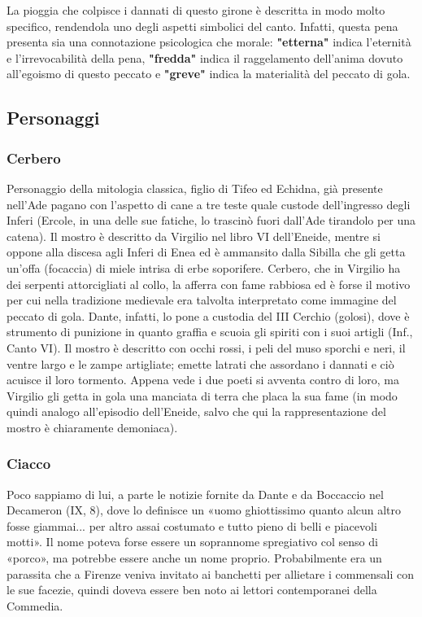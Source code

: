 \documentclass[10pt,a4paper]{article}
\begin{document}
	\label{significati della pioggia}
	La pioggia che colpisce i dannati di questo girone è descritta in modo molto specifico, rendendola uno degli aspetti simbolici del canto. Infatti, questa pena presenta sia una connotazione psicologica che morale: \textbf{"etterna"} indica l'eternità e l'irrevocabilità della pena, \textbf{"fredda"} indica il raggelamento dell'anima dovuto all'egoismo di questo peccato e \textbf{"greve"} indica la materialità del peccato di gola.
	
	\subsection{Personaggi}
	
	\subsubsection{Cerbero}
	
	Personaggio della mitologia classica, figlio di Tifeo ed Echidna, già presente nell'Ade pagano con l'aspetto di cane a tre teste quale custode dell'ingresso degli Inferi (Ercole, in una delle sue fatiche, lo trascinò fuori dall'Ade tirandolo per una catena). Il mostro è descritto da Virgilio nel libro VI dell'Eneide, mentre si oppone alla discesa agli Inferi  di Enea ed è ammansito dalla Sibilla che gli getta un'offa (focaccia) di miele intrisa di erbe soporifere. Cerbero, che in Virgilio ha dei serpenti attorcigliati al collo, la afferra con fame rabbiosa ed è forse il motivo per cui nella tradizione medievale era talvolta interpretato come immagine del peccato di gola.
	Dante, infatti, lo pone a custodia del III Cerchio (golosi), dove è strumento di punizione in quanto graffia e scuoia gli spiriti con i suoi artigli (Inf., Canto VI). Il mostro è descritto con occhi rossi, i peli del muso sporchi e neri, il ventre largo e le zampe artigliate; emette latrati che assordano i dannati e ciò acuisce il loro tormento. Appena vede i due poeti si avventa contro di loro, ma Virgilio gli getta in gola una manciata di terra che placa la sua fame (in modo quindi analogo all'episodio dell'Eneide, salvo che qui la rappresentazione del mostro è chiaramente demoniaca). 
	
	\subsubsection{Ciacco}
	
	Poco sappiamo di lui, a parte le notizie fornite da Dante e da Boccaccio nel Decameron (IX, 8), dove lo definisce un «uomo ghiottissimo quanto alcun altro fosse giammai... per altro assai costumato e tutto pieno di belli e piacevoli motti». Il nome poteva forse essere un soprannome spregiativo col senso di «porco», ma potrebbe essere anche un nome proprio. Probabilmente era un parassita che a Firenze veniva invitato ai banchetti per allietare i commensali con le sue facezie, quindi doveva essere ben noto ai lettori contemporanei della Commedia.
	
\end{document}
